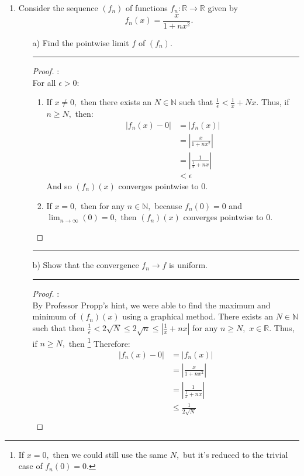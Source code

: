 \documentclass[openany, amssymb, psamsfonts]{amsart}
\newcommand{\bbN}{\mathbb{N}}
\newcommand{\bbR}{\mathbb{R}}
\theoremstyle{definition}
\numberwithin{equation}{section}
\begin{document}
\begin{enumerate}
\item 
Consider the sequence $(f_n)$ of functions $f_n \colon \mathbb{R} \to \mathbb{R}$ given by
$$f_n (x) = \frac{x}{1+nx^2}.$$
\begin{enumerate}
\item[a)] Find the pointwise limit $f$ of $(f_n)$.
\vspace{4pt}    \hrule   \vspace{4pt}\begin{proof}:\\
For all $\epsilon>0:$
\begin{enumerate}
    \item If $x \neq 0,$ then there exists an $N\in \bbN$ such that $\frac{1}{\epsilon}< \frac{1}{x} + Nx.$ Thus, if $n\geq N,$ then:
\begin{align*}
    |f_n(x) - 0| &= |f_n(x)|\\
    &= |\frac{x}{1+nx^2}|\\
    &=|\frac{1}{\frac{1}{x} + nx}|\\
    &< \epsilon
\end{align*}
And so $(f_n)(x)$ converges pointwise to $0.$
\item If $x = 0,$ then for any $n\in \bbN,$ because $f_n(0) = 0$ and  $\displaystyle\lim_{n\to \infty}(0) = 0,$ then $(f_n)(x)$ converges pointwise to $0.$
\end{enumerate}
\end{proof}\vspace{4pt}    \hrule   \vspace{4pt}
\item[b)] Show that the convergence $f_n \to f$ is uniform.
\vspace{4pt}    \hrule   \vspace{4pt}\begin{proof}:\\
By Professor Propp's hint, we were able to find the maximum and minimum of $(f_n)(x)$ using a graphical method. There exists an $N\in \bbN$ such that then $\frac{1}{\epsilon}<2\sqrt{N}\leq 2\sqrt{n}\leq |\frac{1}{x} + nx|$ for any $n\geq N,$ $x\in \bbR.$ Thus, if $n\geq N,$ then \footnote{If $x = 0,$ then we could still use the same $N,$ but it's reduced to the trivial case of $f_n(0) =0.$} Therefore:
\begin{align*}
    |f_n(x) -0|&= |f_n(x)|\\
    &= |\frac{x}{1+nx^2}|\\
    &= |\frac{1}{\frac{1}{x}+nx}|\\
    &\leq \frac{1}{2\sqrt{N}}\\

\end{align*}
\end{proof}
\end{enumerate}
\end{enumerate}
\end{document}
